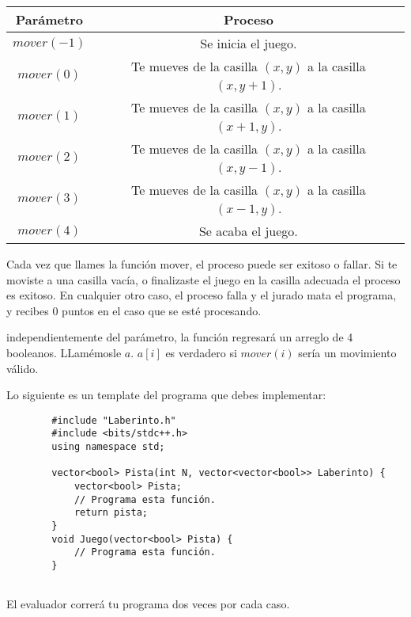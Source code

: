 \documentclass[12pt]{scrartcl}
\begin{document}
    \begin{center}
        \begin{tabular}{|c|c|}
            \hline
            {\bfseries Parámetro} & {\bfseries Proceso}\\
            \hline
             $mover(-1)$ & Se inicia el juego. \\
             \hline
             $mover(0)$ &  Te mueves de la casilla $(x, y)$ a la casilla $(x, y + 1)$. \\
             \hline
             $mover(1)$ & Te mueves de la casilla $(x, y)$ a la casilla $(x + 1, y)$.\\
             \hline
             $mover(2)$ & Te mueves de la casilla $(x, y)$ a la casilla $(x, y - 1)$.\\
             \hline
             $mover(3)$ & Te mueves de la casilla $(x, y)$ a la casilla $(x - 1, y)$.\\
             \hline
             $mover(4)$ & Se acaba el juego.\\
             \hline
        \end{tabular}
    \end{center}

    Cada vez que llames la función mover, el proceso puede ser exitoso o fallar.  Si te moviste a una casilla vacía, o finalizaste el juego en la casilla adecuada el proceso es exitoso. En cualquier otro caso, el proceso falla y el jurado mata el programa, y recibes 0 puntos en el caso que se esté procesando.
    
    
    independientemente del parámetro, la función regresará  un arreglo de 4 booleanos. LLamémosle $a$. $a[i]$ es verdadero si $mover(i)$ sería un movimiento válido. 
    
    Lo siguiente es un template del programa que debes implementar:
    
    \begin{verbatim}
        #include "Laberinto.h"
        #include <bits/stdc++.h>
        using namespace std;
        
        vector<bool> Pista(int N, vector<vector<bool>> Laberinto) {
            vector<bool> Pista;
            // Programa esta función.
            return pista;
        }
        void Juego(vector<bool> Pista) {
            // Programa esta función.
        }
        
    \end{verbatim}

    El evaluador correrá tu programa dos veces por cada caso.
\end{document}
